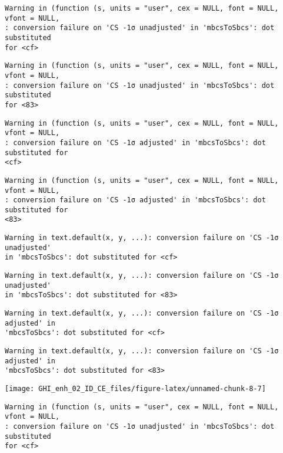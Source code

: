\documentclass[
  10pt,
  a4paper,oneside]{article}
\begin{document}
\begin{verbatim}
Warning in (function (s, units = "user", cex = NULL, font = NULL, vfont = NULL,
: conversion failure on 'CS -1σ unadjusted' in 'mbcsToSbcs': dot substituted
for <cf>
\end{verbatim}

\begin{verbatim}
Warning in (function (s, units = "user", cex = NULL, font = NULL, vfont = NULL,
: conversion failure on 'CS -1σ unadjusted' in 'mbcsToSbcs': dot substituted
for <83>
\end{verbatim}

\begin{verbatim}
Warning in (function (s, units = "user", cex = NULL, font = NULL, vfont = NULL,
: conversion failure on 'CS -1σ adjusted' in 'mbcsToSbcs': dot substituted for
<cf>
\end{verbatim}

\begin{verbatim}
Warning in (function (s, units = "user", cex = NULL, font = NULL, vfont = NULL,
: conversion failure on 'CS -1σ adjusted' in 'mbcsToSbcs': dot substituted for
<83>
\end{verbatim}

\begin{verbatim}
Warning in text.default(x, y, ...): conversion failure on 'CS -1σ unadjusted'
in 'mbcsToSbcs': dot substituted for <cf>
\end{verbatim}

\begin{verbatim}
Warning in text.default(x, y, ...): conversion failure on 'CS -1σ unadjusted'
in 'mbcsToSbcs': dot substituted for <83>
\end{verbatim}

\begin{verbatim}
Warning in text.default(x, y, ...): conversion failure on 'CS -1σ adjusted' in
'mbcsToSbcs': dot substituted for <cf>
\end{verbatim}

\begin{verbatim}
Warning in text.default(x, y, ...): conversion failure on 'CS -1σ adjusted' in
'mbcsToSbcs': dot substituted for <83>
\end{verbatim}

\begin{center}\texttt{[image: GHI\_enh\_02\_ID\_CE\_files/figure-latex/unnamed-chunk-8-7]} \end{center}

\begin{verbatim}
Warning in (function (s, units = "user", cex = NULL, font = NULL, vfont = NULL,
: conversion failure on 'CS -1σ unadjusted' in 'mbcsToSbcs': dot substituted
for <cf>
\end{verbatim}
\end{document}
